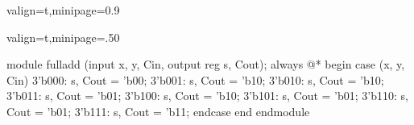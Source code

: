 \documentclass[12pt,openany, tikz,border=10pt]{book}
\begin{document}
\vfill
\begin{adjustbox}{valign=t,minipage={0.9\textwidth}}
\hfill
\noindent
\begin{adjustbox}{valign=t,minipage={.50\textwidth}}
\small
\begin{vhdl}
module fulladd (input x, y, Cin, output reg s, Cout);
	always @*
	begin
		case ({x, y, Cin})
		3'b000: {s, Cout} = 'b00;
		3'b001: {s, Cout} = 'b10;
		3'b010: {s, Cout} = 'b10;
		3'b011: {s, Cout} = 'b01;
		3'b100: {s, Cout} = 'b10;
		3'b101: {s, Cout} = 'b01;
		3'b110: {s, Cout} = 'b01;
		3'b111: {s, Cout} = 'b11;
		endcase
	end
endmodule
\end{vhdl}
\end{adjustbox}
\end{adjustbox}



\label{chap:Verilog}
\end{document}
